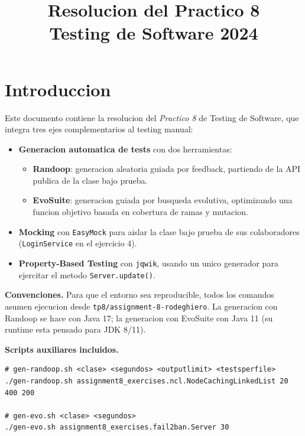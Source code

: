 \documentclass[12pt,a4paper]{article}
\title{\textbf{Resolucion del Practico 8}\\Testing de Software 2024}
\author{}
\date{}
\begin{document}
\maketitle
\tableofcontents
\newpage

\section*{Introduccion}

Este documento contiene la resolucion del \textit{Practico 8} de Testing de Software, que
integra tres ejes complementarios al testing manual:

\begin{itemize}
  \item \textbf{Generacion automatica de tests} con dos herramientas:
  \begin{itemize}
    \item \textbf{Randoop}: generacion aleatoria guiada por feedback, partiendo de la API
    publica de la clase bajo prueba.
    \item \textbf{EvoSuite}: generacion guiada por busqueda evolutiva, optimizando una
    funcion objetivo basada en cobertura de ramas y mutacion.
  \end{itemize}
  \item \textbf{Mocking} con \texttt{EasyMock} para aislar la clase bajo prueba de sus
  colaboradores (\texttt{LoginService} en el ejercicio 4).
  \item \textbf{Property-Based Testing} con \texttt{jqwik}, usando un unico generador para
  ejercitar el metodo \texttt{Server.update()}.
\end{itemize}

\textbf{Convenciones.} Para que el entorno sea reproducible, todos los comandos asumen
ejecucion desde \texttt{tp8/assignment-8-rodeghiero}. La generacion con Randoop se hace con
Java 17; la generacion con EvoSuite con Java 11 (su runtime esta pensado para JDK 8/11).

\textbf{Scripts auxiliares incluidos.}

\begin{lstlisting}[style=codestyle]
# gen-randoop.sh <clase> <segundos> <outputlimit> <testsperfile>
./gen-randoop.sh assignment8_exercises.ncl.NodeCachingLinkedList 20 400 200

# gen-evo.sh <clase> <segundos>
./gen-evo.sh assignment8_exercises.fail2ban.Server 30
\end{lstlisting}
\end{document}
